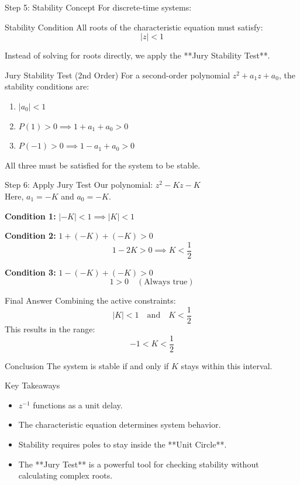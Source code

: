 \documentclass{beamer}
\begin{document}
\begin{frame}{Step 5: Stability Concept}
For discrete-time systems:
\begin{block}{Stability Condition}
All roots of the characteristic equation must satisfy:
\[
|z| < 1
\]
\end{block}

Instead of solving for roots directly, we apply the **Jury Stability Test**.
\end{frame}

\begin{frame}{Jury Stability Test (2nd Order)}
For a second-order polynomial $z^2 + a_1 z + a_0$, the stability conditions are:
\begin{enumerate}
    \item $|a_0| < 1$
    \item $P(1) > 0 \implies 1 + a_1 + a_0 > 0$
    \item $P(-1) > 0 \implies 1 - a_1 + a_0 > 0$
\end{enumerate}
All three must be satisfied for the system to be stable.
\end{frame}

\begin{frame}{Step 6: Apply Jury Test}
Our polynomial: $z^2 - Kz - K$ \\
Here, $a_1 = -K$ and $a_0 = -K$.

\textbf{Condition 1:} $|-K| < 1 \implies |K| < 1$

\textbf{Condition 2:} $1 + (-K) + (-K) > 0$
\[
1 - 2K > 0 \implies K < \frac{1}{2}
\]

\textbf{Condition 3:} $1 - (-K) + (-K) > 0$
\[
1 > 0 \quad (\text{Always true})
\]
\end{frame}

\begin{frame}{Final Answer}
Combining the active constraints:
\[
|K| < 1 \quad \text{and} \quad K < \frac{1}{2}
\]
This results in the range:
\[
\boxed{-1 < K < \frac{1}{2}}
\]
\begin{block}{Conclusion}
The system is stable if and only if $K$ stays within this interval.
\end{block}
\end{frame}

\begin{frame}{Key Takeaways}
\begin{itemize}
    \item $z^{-1}$ functions as a unit delay.
    \item The characteristic equation determines system behavior.
    \item Stability requires poles to stay inside the **Unit Circle**.
    \item The **Jury Test** is a powerful tool for checking stability without calculating complex roots.
\end{itemize}
\end{frame}
\end{document}
